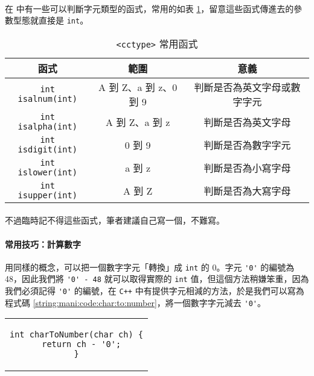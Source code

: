 \documentclass[12pt,a4paper,oneside]{article}
\begin{document}
\begin{CJK}{UTF8}{bkai}
\paragraph{}在  中有一些可以判斷字元類型的函式，常用的如表 \ref{string:mani:table:cctype}，留意這些函式傳進去的參數型態就直接是 \lstinline!int!。

\begin{table}[h!]
  \centering
  \begin{tabular}{|c|c|c|}
  \hline
  \textbf{函式} & \textbf{範圍} & \textbf{意義}\\
  \hline\hline
  \lstinline!int isalnum(int)! & A 到 Z、a 到 z、0 到 9 & 判斷是否為英文字母或數字字元\\
  \hline
  \lstinline!int isalpha(int)! & A 到 Z、a 到 z & 判斷是否為英文字母\\
  \hline
  \lstinline!int isdigit(int)! & 0 到 9 & 判斷是否為數字字元\\
  \hline
  \lstinline!int islower(int)! & a 到 z & 判斷是否為小寫字母\\
  \hline
  \lstinline!int isupper(int)! & A 到 Z & 判斷是否為大寫字母\\
  \hline
  \end{tabular}
  \caption{\lstinline!<cctype>! 常用函式}
  \label{string:mani:table:cctype}
\end{table}

\paragraph{}不過臨時記不得這些函式，筆者建議自己寫一個，不難寫。

\paragraph{常用技巧：計算數字}用同樣的概念，可以把一個數字字元「轉換」成 \lstinline!int! 的 0。字元 \lstinline!'0'! 的編號為 48，因此我們將 \lstinline!'0' - 48! 就可以取得實際的 \lstinline!int! 值，但這個方法稍嫌笨重，因為我們必須記得 \lstinline!'0'! 的編號，在 \texttt{C++} 中有提供字元相減的方法，於是我們可以寫為程式碼 \ref{string:mani:code:char:to:number}，將一個數字字元減去 \lstinline!'0'!。

\begin{code}[h!]
  \centering
  \begin{tabular}{c}
  \begin{lstlisting}
int charToNumber(char ch) {
  return ch - '0';
}
  \end{lstlisting}
  \end{tabular}
  \caption{數字字元轉換為 \lstinline!int!}
  \label{string:mani:code:char:to:number}
\end{code}


\end{CJK}
\end{document}
